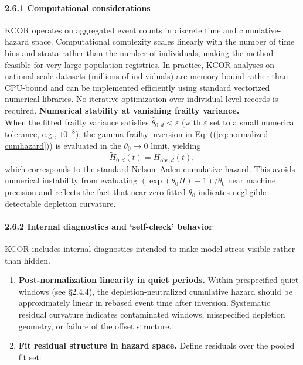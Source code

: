 \documentclass[
]{article}
\begin{document}
\paragraph{2.6.1 Computational
considerations}\label{computational-considerations}

KCOR operates on aggregated event counts in discrete time and
cumulative-hazard space. Computational complexity scales linearly with
the number of time bins and strata rather than the number of
individuals, making the method feasible for very large population
registries. In practice, KCOR analyses on national-scale datasets
(millions of individuals) are memory-bound rather than CPU-bound and can
be implemented efficiently using standard vectorized numerical
libraries. No iterative optimization over individual-level records is
required. \textbf{Numerical stability at vanishing frailty variance.}\\
When the fitted frailty variance satisfies
\(\hat\theta_{0,d} < \varepsilon\) (with \(\varepsilon\) set to a small
numerical tolerance, e.g., \(10^{-8}\)), the gamma-frailty inversion in
Eq. ((\ref{eq:normalized-cumhazard})) is evaluated in the
\(\theta_0 \to 0\) limit, yielding \[
\tilde H_{0,d}(t)=H_{\mathrm{obs},d}(t),
\] which corresponds to the standard Nelson--Aalen cumulative hazard.
This avoids numerical instability from evaluating
\((\exp(\theta_0 H)-1)/\theta_0\) near machine precision and reflects
the fact that near-zero fitted \(\theta_0\) indicates negligible
detectable depletion curvature.

\paragraph{2.6.2 Internal diagnostics and `self-check'
behavior}\label{internal-diagnostics-and-self-check-behavior}

KCOR includes internal diagnostics intended to make model stress visible
rather than hidden.

\begin{enumerate}
\def\labelenumi{\arabic{enumi}.}
\item
  \textbf{Post-normalization linearity in quiet periods.} Within
  prespecified quiet windows (see §2.4.4), the depletion-neutralized
  cumulative hazard should be approximately linear in rebased event time
  after inversion. Systematic residual curvature indicates contaminated
  windows, misspecified depletion geometry, or failure of the offset
  structure.
\item
  \textbf{Fit residual structure in hazard space.} Define residuals over
  the pooled fit set:
\end{enumerate}
\end{document}
